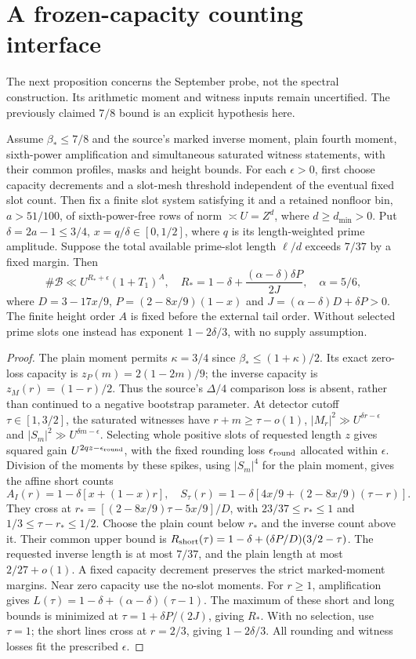 \section{A frozen-capacity counting interface}
The next proposition concerns the September probe, not the spectral
construction. Its arithmetic moment and witness inputs remain uncertified.
The previously claimed $7/8$ bound is an explicit hypothesis here.
\begin{proposition}\label{prop:frozen-row}
Assume $\beta_*\le7/8$ and the source's marked inverse moment, plain
fourth moment, sixth-power amplification and simultaneous saturated
witness statements, with their common profiles, masks and height bounds.
For each $\epsilon>0$, first choose capacity decrements and a
slot-mesh threshold independent of the eventual fixed slot count.
Then fix a finite slot system satisfying it and a retained nonfloor
bin, $a>51/100$, of sixth-power-free rows of
norm $\asymp U=Z^d$, where $d\ge d_{\min}>0$. Put
$\delta=2a-1\le3/4$, $x=q/\delta\in[0,1/2]$, where $q$ is its
length-weighted prime amplitude. Suppose the total available prime-slot
length $\ell/d$ exceeds $7/37$ by a fixed margin. Then
\[
 \#\mathcal B\ll U^{R_*+\epsilon}(1+T_1)^A,
 \quad R_*=1-\delta+\frac{(\alpha-\delta)\delta P}{2J},\quad \alpha=5/6,
\]
where $D=3-17x/9$, $P=(2-8x/9)(1-x)$ and
$J=(\alpha-\delta)D+\delta P>0$. The finite height order $A$ is fixed
before the external tail order. Without selected prime slots one instead
has exponent $1-2\delta/3$, with no supply assumption.
\end{proposition}
\begin{proof}
The plain moment permits $\kappa=3/4$ since
$\beta_*\le(1+\kappa)/2$. Its exact zero-loss capacity is
$z_P(m)=2(1-2m)/9$; the inverse capacity is $z_M(r)=(1-r)/2$.
Thus the source's $\Delta/4$ comparison loss is absent, rather than
continued to a negative bootstrap parameter. At detector cutoff
$\tau\in[1,3/2]$, the saturated witnesses have $r+m\ge\tau-o(1)$,
$|M_r|^2\gg U^{\delta r-\epsilon}$ and
$|S_m|^2\gg U^{\delta m-\epsilon}$. Selecting whole positive slots
of requested length $z$ gives squared gain $U^{2qz-\epsilon_{\rm round}}$, with the
fixed rounding loss $\epsilon_{\rm round}$ allocated within $\epsilon$.
Division of the moments by these spikes, using $|S_m|^4$ for the plain
moment, gives the affine short counts
\[
 A_I(r)=1-\delta[x+(1-x)r],\quad
 S_\tau(r)=1-\delta[4x/9+(2-8x/9)(\tau-r)].
\]
They cross at $r_*=[(2-8x/9)\tau-5x/9]/D$, with
$23/37\le r_*\le1$ and $1/3\le\tau-r_*\le1/2$.
Choose the plain count below $r_*$ and the inverse count above it.
Their common upper bound is
$R_{\rm short}(\tau)=1-\delta+(\delta P/D)(3/2-\tau)$.
The requested inverse length is at most $7/37$, and the plain length
at most $2/27+o(1)$. A fixed capacity decrement preserves the strict
marked-moment margins. Near zero capacity use the no-slot moments.
For $r\ge1$, amplification gives
$L(\tau)=1-\delta+(\alpha-\delta)(\tau-1)$.
The maximum of these short and long bounds is minimized at
$\tau=1+\delta P/(2J)$, giving $R_*$. With no selection, use $\tau=1$;
the short lines cross at $r=2/3$, giving $1-2\delta/3$.
All rounding and witness losses fit the prescribed $\epsilon$.
\end{proof}

